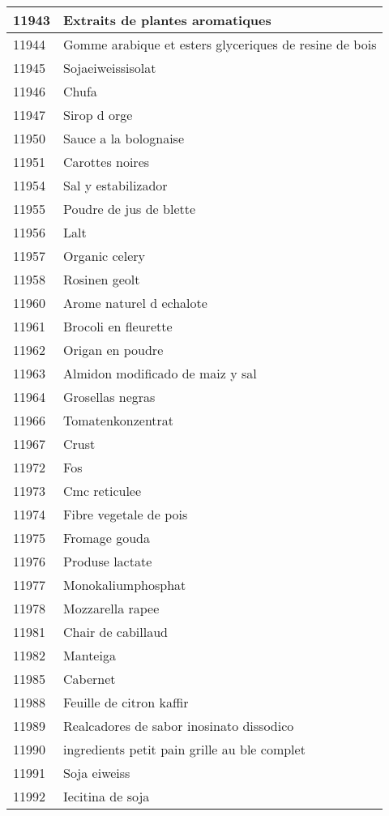 \begin{longtable}{|l|l|}
11943 & Extraits de plantes aromatiques \\ \hline 
11944 & Gomme arabique et esters glyceriques de resine de bois \\ \hline 
11945 & Sojaeiweissisolat \\ \hline 
11946 & Chufa \\ \hline 
11947 & Sirop d orge \\ \hline 
11950 & Sauce a la bolognaise \\ \hline 
11951 & Carottes noires \\ \hline 
11954 & Sal y estabilizador \\ \hline 
11955 & Poudre de jus de blette \\ \hline 
11956 & Lalt \\ \hline 
11957 & Organic celery \\ \hline 
11958 & Rosinen geolt \\ \hline 
11960 & Arome naturel d echalote \\ \hline 
11961 & Brocoli en fleurette \\ \hline 
11962 & Origan en poudre \\ \hline 
11963 & Almidon modificado de maiz y sal \\ \hline 
11964 & Grosellas negras \\ \hline 
11966 & Tomatenkonzentrat \\ \hline 
11967 & Crust \\ \hline 
11972 & Fos \\ \hline 
11973 & Cmc reticulee \\ \hline 
11974 & Fibre vegetale de pois \\ \hline 
11975 & Fromage gouda \\ \hline 
11976 & Produse lactate \\ \hline 
11977 & Monokaliumphosphat \\ \hline 
11978 & Mozzarella rapee \\ \hline 
11981 & Chair de cabillaud \\ \hline 
11982 & Manteiga \\ \hline 
11985 & Cabernet \\ \hline 
11988 & Feuille de citron kaffir \\ \hline 
11989 & Realcadores de sabor inosinato dissodico \\ \hline 
11990 & ingredients petit pain grille au ble complet \\ \hline 
11991 & Soja eiweiss \\ \hline 
11992 & Iecitina de soja \\ \hline 

\end{longtable}
